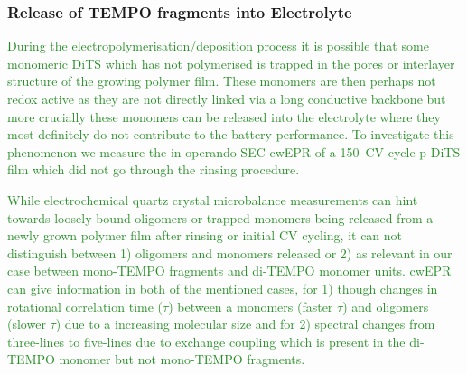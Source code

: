 \documentclass{WileyMSP-template}
\newcommand{\np}[1]{\textcolor{ForestGreen}{#1}}
\begin{document}

\bigbreak

\subsubsection*{Release of TEMPO fragments into Electrolyte}

\np{During the electropolymerisation/deposition process it is possible that some monomeric DiTS which has not polymerised is trapped in the pores or interlayer structure of the growing polymer film. These monomers are then perhaps not redox active as they are not directly linked via a long conductive backbone but more crucially these monomers can be released into the electrolyte where they most definitely do not contribute to the battery performance. To investigate this phenomenon we measure the in-operando SEC cwEPR of a 150~CV cycle p-DiTS film which did not go through the rinsing procedure.}

\bigbreak

\np{	
While electrochemical quartz crystal microbalance measurements can hint towards loosely bound oligomers or trapped monomers being released from a newly grown polymer film after rinsing or initial CV cycling, it can not distinguish between 1) oligomers and monomers released or 2) as relevant in our case between mono-TEMPO fragments and di-TEMPO monomer units. cwEPR can give information in both of the mentioned cases, for 1) though changes in rotational correlation time ($\tau$) between a monomers (faster $\tau$) and oligomers (slower $\tau$) due to a increasing molecular size and for 2) spectral changes from three-lines to five-lines due to exchange coupling which is present in the di-TEMPO monomer but not mono-TEMPO fragments. 
}

\bigbreak
\end{document}
